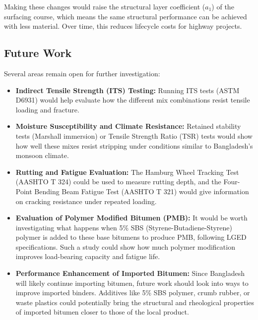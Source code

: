 \documentclass[12pt,a4paper]{article}
\begin{document}
Making these changes would raise the structural layer coefficient ($a_1$) of the surfacing course, which means the same structural performance can be achieved with less material. Over time, this reduces lifecycle costs for highway projects.

\subsection{Future Work}
Several areas remain open for further investigation:
\begin{itemize}
    \item \textbf{Indirect Tensile Strength (ITS) Testing:} Running ITS tests (ASTM D6931) would help evaluate how the different mix combinations resist tensile loading and fracture.
    \item \textbf{Moisture Susceptibility and Climate Resistance:} Retained stability tests (Marshall immersion) or Tensile Strength Ratio (TSR) tests would show how well these mixes resist stripping under conditions similar to Bangladesh's monsoon climate.
    \item \textbf{Rutting and Fatigue Evaluation:} The Hamburg Wheel Tracking Test (AASHTO T 324) could be used to measure rutting depth, and the Four-Point Bending Beam Fatigue Test (AASHTO T 321) would give information on cracking resistance under repeated loading.
    \item \textbf{Evaluation of Polymer Modified Bitumen (PMB):} It would be worth investigating what happens when 5\% SBS (Styrene-Butadiene-Styrene) polymer is added to these base bitumens to produce PMB, following LGED specifications. Such a study could show how much polymer modification improves load-bearing capacity and fatigue life.
    \item \textbf{Performance Enhancement of Imported Bitumen:} Since Bangladesh will likely continue importing bitumen, future work should look into ways to improve imported binders. Additives like 5\% SBS polymer, crumb rubber, or waste plastics could potentially bring the structural and rheological properties of imported bitumen closer to those of the local product.
\end{itemize}

\clearpage
{}
\renewcommand{\refname}{\centering\normalfont\Large\bfseries REFERENCES}
\begin{singlespace}
\let\oldbibliography\thebibliography
\renewcommand{\thebibliography}[1]{%
  \oldbibliography{#1}%
  \setlength{\itemsep}{14pt}%
  \setlength{\parskip}{0pt}%
}


\end{singlespace}
\end{document}
